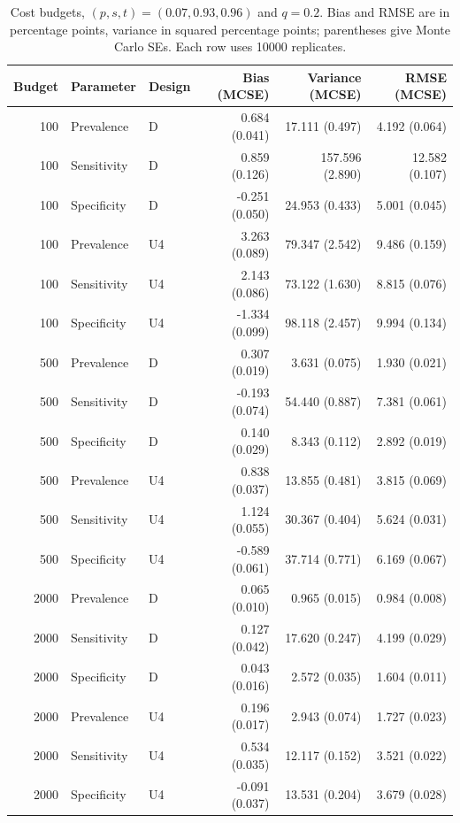 \documentclass[11pt]{article}
\begin{document}
\begin{table}[!htbp]\centering\scriptsize
\caption{Cost budgets, $(p,s,t)=(0.07,0.93,0.96)$ and $q=0.2$. Bias and RMSE are in percentage points, variance in squared percentage points; parentheses give Monte Carlo SEs. Each row uses 10000 replicates.}\label{tab:bias-cost-full}
\begin{tabular}{rllrrr}\toprule
Budget & Parameter & Design & Bias (MCSE) & Variance (MCSE) & RMSE (MCSE)\\\midrule
100 & Prevalence & D & 0.684 (0.041) & 17.111 (0.497) & 4.192 (0.064) \\
100 & Sensitivity & D & 0.859 (0.126) & 157.596 (2.890) & 12.582 (0.107) \\
100 & Specificity & D & -0.251 (0.050) & 24.953 (0.433) & 5.001 (0.045) \\
100 & Prevalence & U4 & 3.263 (0.089) & 79.347 (2.542) & 9.486 (0.159) \\
100 & Sensitivity & U4 & 2.143 (0.086) & 73.122 (1.630) & 8.815 (0.076) \\
100 & Specificity & U4 & -1.334 (0.099) & 98.118 (2.457) & 9.994 (0.134) \\
500 & Prevalence & D & 0.307 (0.019) & 3.631 (0.075) & 1.930 (0.021) \\
500 & Sensitivity & D & -0.193 (0.074) & 54.440 (0.887) & 7.381 (0.061) \\
500 & Specificity & D & 0.140 (0.029) & 8.343 (0.112) & 2.892 (0.019) \\
500 & Prevalence & U4 & 0.838 (0.037) & 13.855 (0.481) & 3.815 (0.069) \\
500 & Sensitivity & U4 & 1.124 (0.055) & 30.367 (0.404) & 5.624 (0.031) \\
500 & Specificity & U4 & -0.589 (0.061) & 37.714 (0.771) & 6.169 (0.067) \\
2000 & Prevalence & D & 0.065 (0.010) & 0.965 (0.015) & 0.984 (0.008) \\
2000 & Sensitivity & D & 0.127 (0.042) & 17.620 (0.247) & 4.199 (0.029) \\
2000 & Specificity & D & 0.043 (0.016) & 2.572 (0.035) & 1.604 (0.011) \\
2000 & Prevalence & U4 & 0.196 (0.017) & 2.943 (0.074) & 1.727 (0.023) \\
2000 & Sensitivity & U4 & 0.534 (0.035) & 12.117 (0.152) & 3.521 (0.022) \\
2000 & Specificity & U4 & -0.091 (0.037) & 13.531 (0.204) & 3.679 (0.028) \\

\bottomrule\end{tabular}\end{table}
\end{document}
